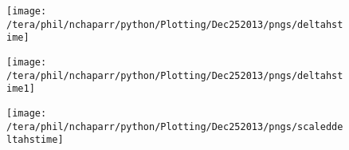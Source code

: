 \begin{figure}[htbp]
    \centering
    \texttt{[image: /tera/phil/nchaparr/python/Plotting/Dec252013/pngs/deltahstime]}
    \caption{}
    \label{fig:deltahvstime}   %
\end{figure}

\begin{figure}[htbp]
    \centering
    \texttt{[image: /tera/phil/nchaparr/python/Plotting/Dec252013/pngs/deltahstime1]}
    \caption{}
    \label{fig:deltahvstime1}   %
\end{figure}

\begin{figure}[htbp]
    \centering
    \texttt{[image: /tera/phil/nchaparr/python/Plotting/Dec252013/pngs/scaleddeltahstime]}
    \caption{}
    \label{fig:scaleddeltahstime}   %
\end{figure}

\begin{figure}[htbp]

\begin{minipage}[b]{0.5\linewidth}
         
        \\
        \end{minipage}             
\quad
\begin{minipage}[b]{0.5\linewidth}
        \\
       
       \end{minipage}
        \caption{}
        \label{fig:invristime}
\end{figure}


\begin{figure}[htbp]
\begin{minipage}[b]{0.5\linewidth}
        \\
        \end{minipage}             
\quad
\begin{minipage}[b]{0.5\linewidth}
        \\
       
       \end{minipage}
        \caption{}
        \label{fig:scaledweinvri}
\end{figure}

